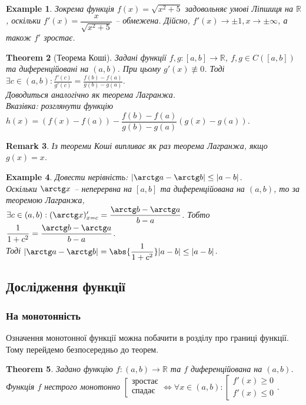 \documentclass[a4paper, 14pt]{article}
\theoremstyle{theoremdd}
\newtheorem{theorem}{Theorem}[subsection]
\theoremstyle{theoremdd}
\theoremstyle{theoremdd}
\theoremstyle{theoremdd}
\newtheorem{example}[theorem]{Example}
\theoremstyle{theoremdd}
\theoremstyle{theoremdd}
\newtheorem{remark}[theorem]{Remark}
\theoremstyle{theoremdd}
\theoremstyle{theoremdd}
\begin{document}
\begin{example}
Зокрема функція $f(x) =\sqrt{x^2+5}$ задовольняє умові Ліпшиця на $\mathbb{R}$, оскільки $f'(x) = \dfrac{x}{\sqrt{x^2+5}}$ -- обмежена. Дійсно, $f'(x) \to \pm 1, x \to \pm \infty$, а також $f'$ зростає.
\end{example}

\begin{theorem}[Теорема Коші]
Задані функції $f,g \colon [a,b] \to \mathbb{R}$, $f,g \in C([a,b])$ та диференційовані на $(a,b)$. При цьому $g'(x) \not\equiv 0$. Тоді $\exists c \in (a,b): \displaystyle \frac{f'(c)}{g'(c)}  =  \frac{f(b)-f(a)}{g(b)-g(a)}$.\\
\textit{Доводиться аналогічно як теорема Лагранжа.}\\
\textit{Вказівка: розглянути функцію $h(x) = (f(x) - f(a)) - \dfrac{f(b)-f(a)}{g(b)-g(a)}(g(x)-g(a))$.}
\end{theorem}

\begin{remark}
Із теореми Коші випливає як раз теорема Лагранжа, якщо $g(x) = x$.
\end{remark}

\begin{example}
Довести нерівність: $|\arctg a - \arctg b| \leq |a-b|$.\\
Оскільки $\arctg x$ -- неперервна на $[a,b]$ та диференційована на $(a,b)$, то за теоремою Лагранжа,\\
$\exists c \in (a,b): (\arctg x)'_{x = c} = \dfrac{\arctg b - \arctg a}{b-a}$. Тобто $\dfrac{1}{1+c^2} =\dfrac{\arctg b - \arctg a}{b-a}$.\\
Тоді $|\arctg a - \arctg b| = \abs{\dfrac{1}{1+c^2}} |a-b| \leq |a-b|$.
\end{example}

\subsection{Дослідження функції}
\subsubsection{На монотонність}
Означення монотонної функції можна побачити в розділу про границі функції. Тому перейдемо безпосередньо до теорем.
\begin{theorem}
Задано функцію $f \colon (a,b) \to \mathbb{R}$ та $f$ диференційована на $(a,b)$.\\
Функція $f$ нестрого монотонно $\left[ \begin{gathered} \textrm{зростає} \\ \textrm{спадає} \end{gathered} \right. \iff \forall x \in (a,b): \left[ \begin{gathered} f'(x) \geq 0 \\ f'(x) \leq 0 \end{gathered} \right.$.
\end{theorem}
\end{document}
